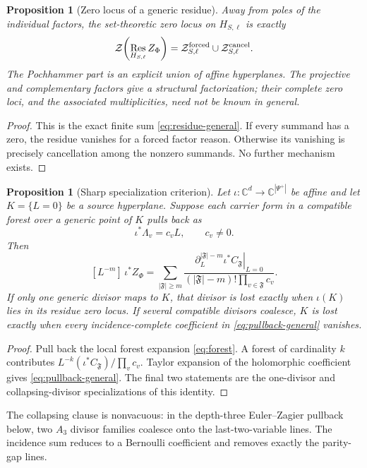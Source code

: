 \documentclass[11pt]{article}
\newtheorem{proposition}[theorem]{Proposition}
\renewcommand{\boxed}[1]{#1}
\newcommand{\C}{\mathbb C}
\newcommand{\Res}{\operatorname*{Res}}
\newcommand{\Zero}{\mathcal Z}
\begin{document}
\begin{proposition}[Zero locus of a generic residue]\label{prop:zero-locus}
Away from poles of the individual factors, the set-theoretic zero locus on
\(H_{S,\ell}\) is exactly
\[
 \boxed{
 \Zero\!\left(
 \Res_{H_{S,\ell}}Z_\Phi\right)
 =
 \Zero^{\rm forced}_{S,\ell}
 \cup\Zero^{\rm cancel}_{S,\ell}.}
\]
The Pochhammer part is an explicit union of affine hyperplanes.
The projective and complementary factors give a structural
factorization; their complete zero loci, and the associated
multiplicities, need not be known in general.
\end{proposition}

\begin{proof}
This is the exact finite sum \eqref{eq:residue-general}.  If every
summand has a zero, the residue vanishes for a forced factor reason.
Otherwise its vanishing is precisely cancellation among the nonzero
summands.  No further mechanism exists.
\end{proof}

\begin{proposition}[Sharp specialization criterion]\label{prop:thin}
Let \(\iota:\C^d\to\C^{|\Psi^+|}\) be affine and let \(K=\{L=0\}\)
be a source hyperplane.  Suppose each carrier form in a compatible
forest over a generic point of \(K\) pulls back as
\[
 \iota^*\Lambda_v=c_vL,\qquad c_v\ne0.
\]
Then
\begin{equation}\label{eq:pullback-general}
 [L^{-m}]\,\iota^*Z_\Phi
 =
 \sum_{|\mathfrak F|\ge m}
 \frac{
   \left.
   \partial_L^{|\mathfrak F|-m}
   \iota^*C_{\mathfrak F}
   \right|_{L=0}
 }{(|\mathfrak F|-m)!\prod_{v\in\mathfrak F}c_v}.
\end{equation}
If only one generic divisor maps to \(K\), that divisor is lost exactly
when \(\iota(K)\) lies in its residue zero locus.  If several
compatible divisors coalesce, \(K\) is lost exactly when every
incidence-complete coefficient in \eqref{eq:pullback-general} vanishes.
\end{proposition}

\begin{proof}
Pull back the local forest expansion \eqref{eq:forest}.  A forest of
cardinality \(k\) contributes
\(L^{-k}(\iota^*C_{\mathfrak F})/\prod_vc_v\).
Taylor expansion of the holomorphic coefficient gives
\eqref{eq:pullback-general}.  The final two statements are the
one-divisor and collapsing-divisor specializations of this identity.
\end{proof}

The collapsing clause is nonvacuous: in the depth-three
Euler--Zagier pullback below, two \(A_3\) divisor families coalesce onto
the last-two-variable lines.  The incidence sum reduces to a Bernoulli
coefficient and removes exactly the parity-gap lines.
\end{document}
